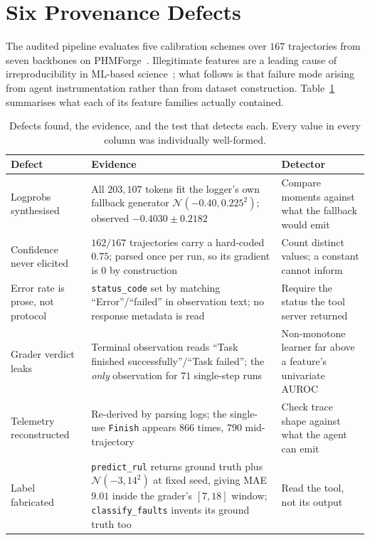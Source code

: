 \documentclass[conference]{IEEEtran}
\begin{document}
\section{Six Provenance Defects}
\label{sec:defects}

The audited pipeline evaluates five calibration schemes over $167$ trajectories
from seven backbones on PHMForge~\cite{phmforge}. Illegitimate features are a
leading cause of irreproducibility in ML-based science~\cite{kapoor}; what
follows is that failure mode arising from agent instrumentation rather than from
dataset construction. Table~\ref{tab:defects}
summarises what each of its feature families actually contained.

\begin{table}[t]
\centering
\caption{Defects found, the evidence, and the test that detects each. Every
value in every column was individually well-formed.}
\label{tab:defects}
\footnotesize
\begin{tabular}{p{1.45cm}p{3.1cm}p{2.6cm}}
\toprule
\textbf{Defect} & \textbf{Evidence} & \textbf{Detector} \\
\midrule
Logprobs synthesised & All $203{,}107$ tokens fit the logger's own fallback
generator $\mathcal{N}(-0.40,0.225^2)$; observed $-0.4030\pm0.2182$ &
Compare moments against what the fallback would emit \\
\addlinespace
Confidence never elicited & $162/167$ trajectories carry a hard-coded $0.75$;
parsed once per run, so its gradient is $0$ by construction &
Count distinct values; a constant cannot inform \\
\addlinespace
Error rate is prose, not protocol & \texttt{status\_code} set by matching
``Error''/``failed'' in observation text; no response metadata is read &
Require the status the tool server returned \\
\addlinespace
Grader verdict leaks & Terminal observation reads ``Task finished
successfully''/``Task failed''; the \emph{only} observation for $71$ single-step
runs & Non-monotone learner far above a feature's univariate AUROC \\
\addlinespace
Telemetry reconstructed & Re-derived by parsing logs; the single-use
\texttt{Finish} appears $866$ times, $790$ mid-trajectory &
Check trace shape against what the agent can emit \\
\addlinespace
Label fabricated & \texttt{predict\_rul} returns ground truth plus
$\mathcal{N}(-3,14^2)$ at fixed seed, giving MAE $9.01$ inside the grader's
$[7,18]$ window; \texttt{classify\_faults} invents its ground truth too &
Read the tool, not its output \\
\bottomrule
\end{tabular}
\end{table}
\end{document}
